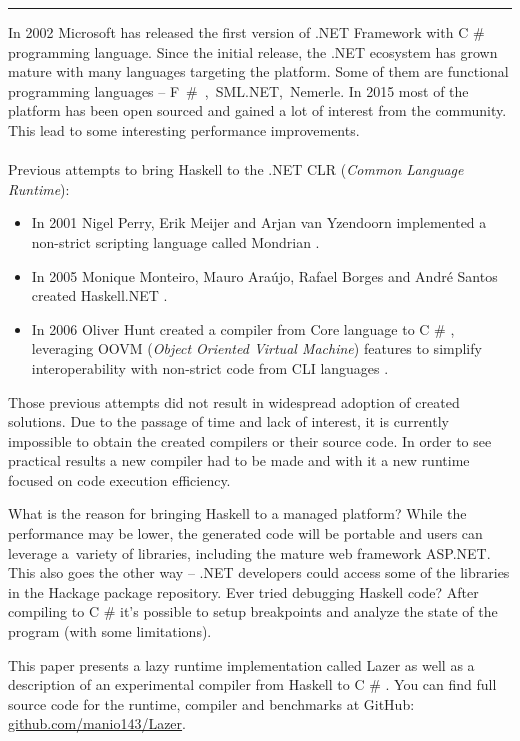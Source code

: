 \documentclass[en]{pracamgr}
\newcommand{\shrp}{%
  {\fontfamily{ppl}\selectfont\#%
  }}
\begin{document}
{
    \centering \rule[3pt]{9cm}{.3pt}

}

In 2002 Microsoft has released the first version of .NET Framework with
C\shrp{} programming language. Since the initial release, the .NET ecosystem
has grown mature with many languages targeting the platform. 
Some of them are functional programming languages -- \mbox{F\shrp{}, SML.NET, Nemerle}.
In 2015 most of the platform has been open sourced and gained a lot of
interest from the community. This lead to some interesting performance
improvements.\\ \\
Previous attempts to bring
Haskell to the .NET CLR (\textit{Common Language Runtime}):
\begin{itemize}
  \item
  In 2001 Nigel Perry, Erik Meijer and Arjan van Yzendoorn implemented a 
  non-strict scripting language called Mondrian
  \cite{MondrianImplDetails}\cite{PerryMeijer}.
  
  \item
  In 2005 Monique Monteiro, Mauro Ara\'ujo, Rafael Borges and Andr\'e Santos
  created Haskell.NET
  \cite{Brazil}.

  \item
  In 2006 Oliver Hunt created a compiler from Core language to C\shrp{}, leveraging
  OOVM (\textit{Object Oriented Virtual Machine}) features to simplify interoperability
  with non-strict code from CLI languages \cite{Hunt}.
\end{itemize}

Those previous attempts did not result in widespread adoption of created solutions.
Due to the passage of time and lack of interest, it is currently impossible
to obtain the created compilers or their source code.
In order to see practical results a new compiler had to be made
and with it a new runtime focused on code execution efficiency.

\newpage
What is the reason for bringing Haskell to a managed platform?
While the performance may be lower, the generated code will be portable
and users can leverage a~variety of libraries, including the mature web framework
ASP.NET. This also goes the other way -- .NET developers could access some of
the libraries in the Hackage package repository.
Ever tried debugging Haskell code? After compiling to C\shrp{} it's possible
to setup breakpoints and analyze the state of the program (with some limitations).

This paper presents a lazy runtime implementation called Lazer as well as
a description of an experimental compiler from Haskell to C\shrp{}.
You can find full source code for the runtime, compiler and benchmarks at GitHub:
\href{https://github.com/manio143/Lazer}{github.com/manio143/Lazer}.
\end{document}
